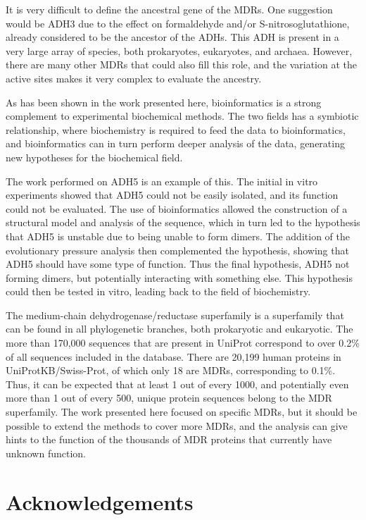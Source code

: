 \documentclass[a4paper, twoside, 12pt, openright]{report}
\begin{document}
It is very difficult to define the ancestral gene of the MDRs. One suggestion would be ADH3 due to the effect on formaldehyde and/or S-nitrosoglutathione, already considered to be the ancestor of the ADHs\cite{danielsson_enzymogenesis:_1992, hoog_mammalian_2001-1}. This ADH is present in a very large array of species, both prokaryotes, eukaryotes, and archaea. However, there are many other MDRs that could also fill this role, and the variation at the active sites makes it very complex to evaluate the ancestry.

As has been shown in the work presented here, bioinformatics is a strong complement to experimental biochemical methods. The two fields has a symbiotic relationship, where biochemistry is required to feed the data to bioinformatics, and bioinformatics can in turn perform deeper analysis of the data, generating new hypotheses for the biochemical field.

The work performed on ADH5 is an example of this. The initial in vitro experiments showed that ADH5 could not be easily isolated, and its function could not be evaluated. The use of bioinformatics allowed the construction of a structural model and analysis of the sequence, which in turn led to the hypothesis that ADH5 is unstable due to being unable to form dimers. The addition of the evolutionary pressure analysis then complemented the hypothesis, showing that ADH5 should have some type of function. Thus the final hypothesis, ADH5 not forming dimers, but potentially interacting with something else. This hypothesis could then be tested in vitro, leading back to the field of biochemistry.

The medium-chain dehydrogenase/reductase superfamily is a superfamily that can be found in all phylogenetic branches, both prokaryotic and eukaryotic. The more than 170,000 sequences that are present in UniProt correspond to over 0.2\% of all sequences included in the database. There are 20,199 human proteins in UniProtKB/Swiss-Prot, of which only 18 are MDRs, corresponding to 0.1\%. Thus, it can be expected that at least 1 out of every 1000, and potentially even more than 1 out of every 500, unique protein sequences belong to the MDR superfamily. The work presented here  focused on specific MDRs, but it should be possible to extend the methods to cover more MDRs, and the analysis can give hints to the function of the thousands of MDR proteins that currently have unknown function.


\chapter{Acknowledgements}
\label{sec:acknowledgements}
\end{document}
